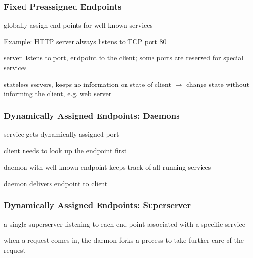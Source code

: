 \subsubsection{Fixed Preassigned Endpoints}
\begin{compactitem}
	\item globally assign end points for well-known services
	\item Example: HTTP server always listens to TCP port 80
	\item server listens to port, endpoint to the client; some ports are reserved for special services
	\item stateless servers, keeps no information on state of client $\rightarrow$ change state without informing the client, e.g. web server
\end{compactitem}

\subsubsection{Dynamically Assigned Endpoints: Daemons}

\begin{compactitem}
	\item service gets dynamically assigned port
	\item client needs to look up the endpoint first
	\item daemon with well known endpoint keeps track of all running services
	\item daemon delivers endpoint to client
\end{compactitem}

\subsubsection{Dynamically Assigned Endpoints: Superserver}

\begin{compactitem}
	\item a single superserver listening to each end point associated with a specific service
	\item when a request comes in, the daemon forks a process to take further care of the request
	\item 
\end{compactitem}


